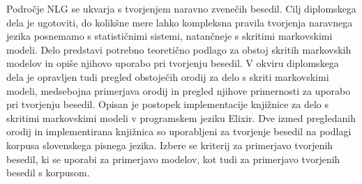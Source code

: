 Področje NLG se ukvarja s tvorjenjem naravno zvenečih besedil.
Cilj diplomskega dela je ugotoviti, do kolikšne mere lahko kompleksna pravila tvorjenja naravnega jezika posnemamo s statističnimi sistemi, natančneje s skritimi markovskimi modeli. 
Delo predstavi potrebno teoretično podlago za obstoj skritih markovskih modelov in opiše njihovo uporabo pri tvorjenju besedil.
V okviru diplomskega dela je opravljen tudi pregled obstoječih orodij za delo s skriti markovskimi modeli, medsebojna primerjava orodij in pregled njihove primernosti za uporabo pri tvorjenju besedil.
Opisan je postopek implementacije knjižnice za delo s skritimi markovskimi modeli v programskem jeziku Elixir.
Dve izmed pregledanih orodij in implementirana knjižnica so uporabljeni za tvorjenje besedil na podlagi korpusa slovenskega pisnega jezika.
Izbere se kriterij za primerjavo tvorjenih besedil, ki se uporabi za primerjavo modelov, kot tudi za primerjavo tvorjenih besedil s korpusom.
